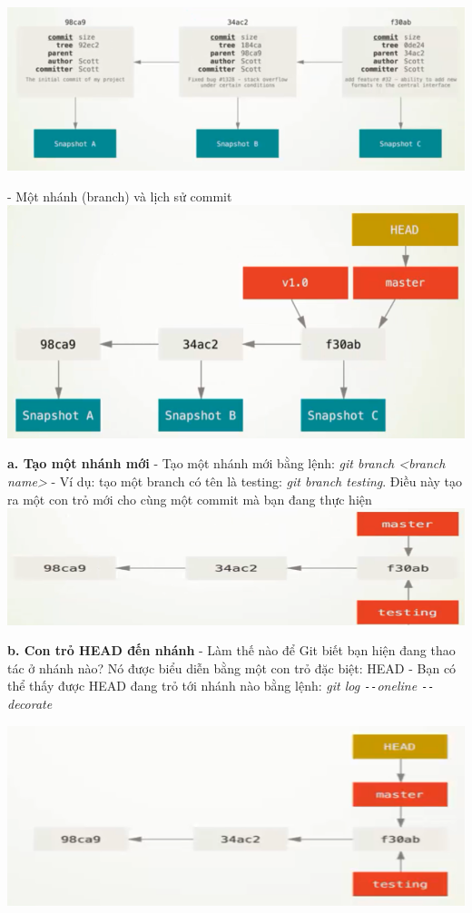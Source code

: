\documentclass[12pt,a4paper]{report}
\begin{document}
	\includegraphics[width=0.8\linewidth]{screenshot049}
	
	\label{fig:screenshot049}
\vskip 0.4cm\vskip 0.4cm
- Một nhánh (branch) và lịch sử commit 	
\vskip 0.4cm
	\includegraphics[width=0.8\linewidth]{screenshot050}

	\label{fig:screenshot050}
\vskip 0.4cm\vskip 0.4cm
{\bf a. Tạo một nhánh mới}\vskip 0.4cm
- Tạo một nhánh mới bằng lệnh: {\it git branch <branch name>}\vskip 0.4cm
- Ví dụ: tạo một branch có tên là testing: \textit{git branch testing}. Điều này tạo ra một con trỏ mới cho cùng một commit mà bạn đang thực hiện
\vskip 0.4cm
	\includegraphics[width=0.8\linewidth]{screenshot051}

	\label{fig:screenshot051}
\vskip 0.4cm\vskip 0.4cm
{\bf b. Con trỏ HEAD đến nhánh}\vskip 0.4cm
- Làm thế nào để Git biết bạn hiện đang thao tác ở nhánh nào? Nó được biểu diễn bằng một con trỏ đặc biệt: HEAD\vskip 0.4cm
- Bạn có thể thấy được HEAD đang trỏ tới nhánh nào bằng lệnh: {\it git log \texttt{-{}-}oneline \texttt{-{}-}decorate}\vskip 0.4cm

	\includegraphics[width=0.8\linewidth]{screenshot052}
	
\end{document}

